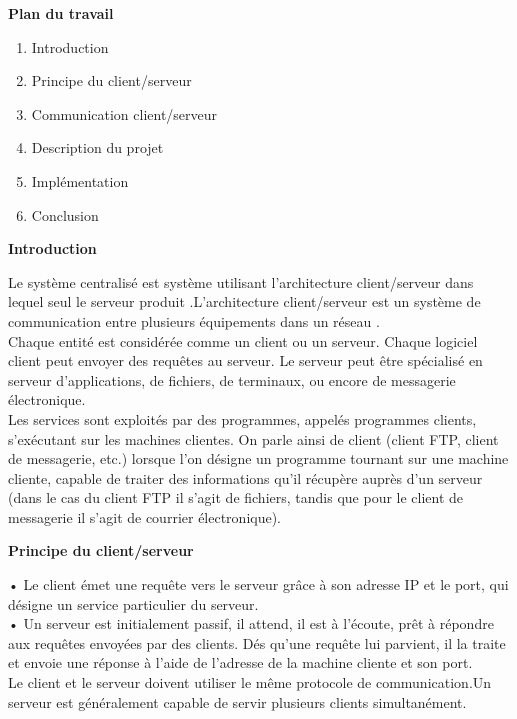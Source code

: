 \documentclass[12pt, openany]{report}
\begin{document}
\newpage
\begin{center}
\textbf{Plan du travail}
\end{center}
\begin{enumerate}
\item Introduction
\item Principe du client/serveur
\item Communication client/serveur 
\item Description du projet
\item Implémentation
\item Conclusion
\end{enumerate}
\newpage
\begin{center}
\textbf{Introduction}\\
\end{center}
Le système centralisé est système utilisant l’architecture client/serveur dans lequel seul le serveur produit .L’architecture client/serveur est un système de communication entre plusieurs équipements dans un réseau .\\
Chaque entité est considérée comme un client ou un serveur. Chaque logiciel client peut envoyer des requêtes au serveur. Le serveur peut être spécialisé en serveur d’applications, de fichiers, de terminaux, ou encore de messagerie électronique.\\
Les services sont exploités par des programmes, appelés programmes clients, s'exécutant sur les machines clientes. On parle ainsi de client (client FTP, client de messagerie, etc.) lorsque l'on désigne un programme tournant sur une machine cliente, capable de traiter des informations qu'il récupère auprès d'un serveur (dans le cas du client FTP il s'agit de fichiers, tandis que pour le client de messagerie il s'agit de courrier électronique).
\newpage
\begin{center}
\textbf{ Principe du client/serveur}\\
\end{center}
    • Le client émet une requête vers le serveur grâce à son adresse IP et le port, qui désigne un service particulier du serveur.\\
    • Un serveur est initialement passif, il attend, il est à l’écoute, prêt à répondre aux requêtes envoyées par des clients. Dés qu’une requête lui parvient, il la traite et envoie une réponse à l'aide de l'adresse de la machine cliente et son port.\\
Le client et le serveur doivent utiliser le même protocole de communication.Un serveur est généralement capable de servir plusieurs clients simultanément.\\
\end{document}
